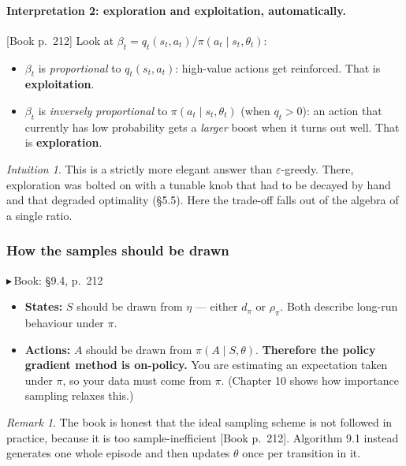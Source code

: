 \documentclass[11pt, letterpaper]{article}
\theoremstyle{runin}
\theoremstyle{runinplain}
\theoremstyle{remark}
\newtheorem*{remark}{Remark}
\newtheorem*{intuition}{Intuition}
\newcommand{\bk}[1]{{\color{bookblue}\small$\blacktriangleright$\,\textsf{Book: #1}}}
\newcommand{\bkin}[1]{{\color{bookblue}\small[\textsf{Book #1}]}}
\begin{document}
\paragraph{Interpretation 2: exploration and exploitation, automatically.}
\bkin{p.~212} Look at $\beta_t=q_t(s_t,a_t)/\pi(a_t\mid s_t,\theta_t)$:

\begin{itemize}
  \item $\beta_t$ is \emph{proportional} to $q_t(s_t,a_t)$: high-value actions get
        reinforced. That is \textbf{exploitation}.
  \item $\beta_t$ is \emph{inversely proportional} to $\pi(a_t\mid s_t,\theta_t)$
        (when $q_t>0$): an action that currently has low probability gets a
        \emph{larger} boost when it turns out well. That is \textbf{exploration}.
\end{itemize}

\begin{intuition}
This is a strictly more elegant answer than $\varepsilon$-greedy. There, exploration
was bolted on with a tunable knob that had to be decayed by hand and that degraded
optimality (\S5.5). Here the trade-off falls out of the algebra of a single ratio.
\end{intuition}

\subsubsection{How the samples should be drawn}

\bk{\S9.4, p.~212}

\begin{itemize}
  \item \textbf{States:} $S$ should be drawn from $\eta$ --- either $d_\pi$ or
        $\rho_\pi$. Both describe long-run behaviour under $\pi$.
  \item \textbf{Actions:} $A$ should be drawn from $\pi(A\mid S,\theta)$.
        \textbf{Therefore the policy gradient method is on-policy.} You are
        estimating an expectation taken under $\pi$, so your data must come from
        $\pi$. (Chapter 10 shows how importance sampling relaxes this.)
\end{itemize}

\begin{remark}
The book is honest that the ideal sampling scheme is not followed in practice,
because it is too sample-inefficient \bkin{p.~212}. Algorithm 9.1 instead generates
one whole episode and then updates $\theta$ once per transition in it.
\end{remark}
\end{document}
